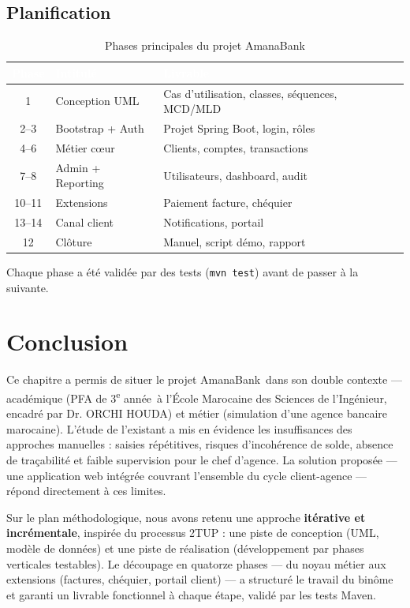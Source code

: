 \documentclass[11pt,a4paper,oneside]{report}
\newcommand{\tabhead}[1]{\textcolor{white}{\textbf{#1}}}
\newcommand{\encadrante}{Dr. ORCHI HOUDA}
\newcommand{\ecole}{École Marocaine des Sciences de l'Ingénieur}
\newcommand{\niveau}{3\textsuperscript{e} année}
\newcommand{\nomapplication}{AmanaBank}
\begin{document}
\subsection{Planification}

\begin{table}[H]
    \centering
    \caption{Phases principales du projet \nomapplication}
    \label{tab:phases}
    \small
    \begin{tabular}{@{}clp{7cm}@{}}
        \rowcolor{AmanaBrown}
        \tabhead{Phase} & \tabhead{Intitulé} & \tabhead{Livrable} \\
        \midrule
        1 & Conception UML & Cas d'utilisation, classes, séquences, MCD/MLD \\
        2--3 & Bootstrap + Auth & Projet Spring Boot, login, rôles \\
        4--6 & Métier cœur & Clients, comptes, transactions \\
        7--8 & Admin + Reporting & Utilisateurs, dashboard, audit \\
        10--11 & Extensions & Paiement facture, chéquier \\
        13--14 & Canal client & Notifications, portail \\
        12 & Clôture & Manuel, script démo, rapport \\
        \bottomrule
    \end{tabular}
\end{table}

Chaque phase a été validée par des tests (\texttt{mvn test}) avant de passer à la suivante.

\section{Conclusion}

Ce chapitre a permis de situer le projet \nomapplication\ dans son double contexte --- académique (PFA de \niveau\ à l'\ecole, encadré par \encadrante) et métier (simulation d'une agence bancaire marocaine). L'étude de l'existant a mis en évidence les insuffisances des approches manuelles : saisies répétitives, risques d'incohérence de solde, absence de traçabilité et faible supervision pour le chef d'agence. La solution proposée --- une application web intégrée couvrant l'ensemble du cycle client-agence --- répond directement à ces limites.

Sur le plan méthodologique, nous avons retenu une approche \textbf{itérative et incrémentale}, inspirée du processus 2TUP : une piste de conception (UML, modèle de données) et une piste de réalisation (développement par phases verticales testables). Le découpage en quatorze phases --- du noyau métier aux extensions (factures, chéquier, portail client) --- a structuré le travail du binôme et garanti un livrable fonctionnel à chaque étape, validé par les tests Maven.
\end{document}

